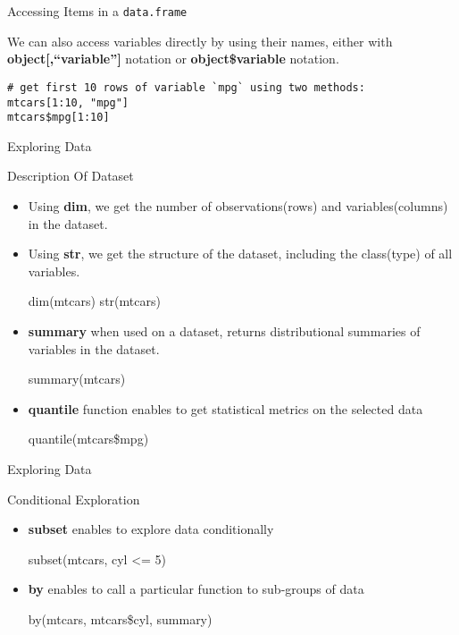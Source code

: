 \begin{frame}[fragile]{Accessing Items in a \texttt{data.frame}}

We can also access variables directly by using their names, either with
\textbf{object{[},``variable''{]}} notation or \textbf{object\$variable}
notation.

\begin{verbatim}
# get first 10 rows of variable `mpg` using two methods:
mtcars[1:10, "mpg"]
mtcars$mpg[1:10]
\end{verbatim}

\end{frame}

\begin{frame}{Exploring Data}

\begin{block}{Description Of Dataset}

\begin{itemize}
\item
  Using \textbf{dim}, we get the number of observations(rows) and
  variables(columns) in the dataset.
\item
  Using \textbf{str}, we get the structure of the dataset, including the
  class(type) of all variables.

  dim(mtcars) str(mtcars)
\item
  \textbf{summary} when used on a dataset, returns distributional
  summaries of variables in the dataset.

  summary(mtcars)
\item
  \textbf{quantile} function enables to get statistical metrics on the
  selected data

  quantile(mtcars\$mpg)
\end{itemize}

\end{block}

\end{frame}

\begin{frame}{Exploring Data}

\begin{block}{Conditional Exploration}

\begin{itemize}
\item
  \textbf{subset} enables to explore data conditionally

  subset(mtcars, cyl \textless{}= 5)
\item
  \textbf{by} enables to call a particular function to sub-groups of
  data

  by(mtcars, mtcars\$cyl, summary)
\end{itemize}

\end{block}

\end{frame}

